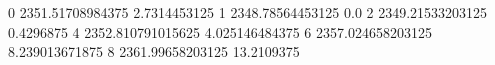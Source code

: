 0 2351.51708984375 2.7314453125
1 2348.78564453125 0.0
2 2349.21533203125 0.4296875
4 2352.810791015625 4.025146484375
6 2357.024658203125 8.239013671875
8 2361.99658203125 13.2109375

